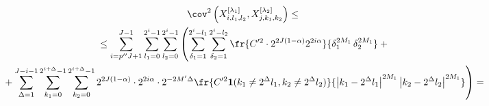 \begin{multline*}
{{} }


\cov^2\left(X_{i,l_1,l_2}^{[\lambda_1]},


X_{j,k_1,k_2}^{[\lambda_2]}\right) \leq{}\\


{}\leq \sum\limits_{i = p''J + 1}^{J - 1} \sum\limits_{l_1 = 0}^{2^i - 1}


\sum\limits_{l_2 = 0}^{2^i - 1}


\left(\sum\limits_{\delta_1 = 1}^{2^i - l_1} \sum\limits_{\delta_2 = 1}^{2^i - l_2}


\fr{ C'^2 \cdot2^{2J(1-\alpha)}2^{2i\alpha}}{\delta_1^{2M_1}\, \delta_2^{2M_1}} +{}


\right.\\


\left.{}+ \sum\limits_{\Delta = 1}^{J-i-1}\sum\limits_{k_1 = 0}^{2^{i+\Delta} - 1}


\sum\limits_{k_2 = 0}^{2^{i+\Delta} - 1}


2^{2J(1-\alpha)}\cdot 2^{2i\alpha}\cdot 2^{-2M'\Delta}


\fr{C'^2\mathbf{1}(k_1 \neq 2^{\Delta} l_1,k_2 \neq 2^{\Delta} l_2)}


{\left\vert k_1 - 2^{\Delta} l_1\right\vert^{2M_1}\left\vert k_2 - 2^{\Delta} l_2\right\vert^{2M_1}} \right) ={}


\end{multline*}





\noindent


